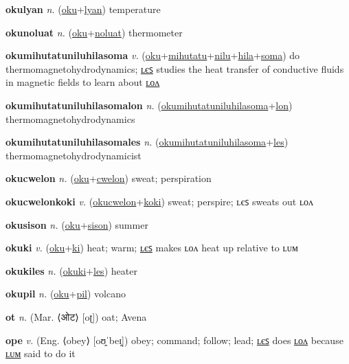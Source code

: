 \textbf{\hypertarget{okulyan}{okulyan}} \textit{n.} (\hyperlink{oku}{oku}+\allowbreak \hyperlink{lyan}{lyan})
temperature

\textbf{\hypertarget{okunoluat}{okunoluat}} \textit{n.} (\hyperlink{oku}{oku}+\allowbreak \hyperlink{noluat}{noluat})
thermometer

\textbf{\hypertarget{okumihutatuniluhilasoma}{okumihutatuniluhilasoma}} \textit{v.} (\hyperlink{oku}{oku}+\allowbreak \hyperlink{mihutatu}{mihutatu}+\allowbreak \hyperlink{nilu}{nilu}+\allowbreak \hyperlink{hila}{hila}+\allowbreak \hyperlink{soma}{soma})
do thermomagnetohydrodynamics; \hyperlink{okumihutatuniluhilasomales}{ʟєꜱ} studies the heat transfer of conductive fluids in magnetic fields to learn about \hyperlink{okumihutatuniluhilasomalon}{ʟᴏᴧ}

\textbf{\hypertarget{okumihutatuniluhilasomalon}{okumihutatuniluhilasomalon}} \textit{n.} (\hyperlink{okumihutatuniluhilasoma}{okumihutatuniluhilasoma}+\allowbreak \hyperlink{lon}{lon})
thermomagnetohydrodynamics

\textbf{\hypertarget{okumihutatuniluhilasomales}{okumihutatuniluhilasomales}} \textit{n.} (\hyperlink{okumihutatuniluhilasoma}{okumihutatuniluhilasoma}+\allowbreak \hyperlink{les}{les})
thermomagnetohydrodynamicist

\textbf{\hypertarget{okucwelon}{okucwelon}} \textit{n.} (\hyperlink{oku}{oku}+\allowbreak \hyperlink{cwelon}{cwelon})
sweat; perspiration

\textbf{\hypertarget{okucwelonkoki}{okucwelonkoki}} \textit{v.} (\hyperlink{okucwelon}{okucwelon}+\allowbreak \hyperlink{koki}{koki})
sweat; perspire; ʟєꜱ sweats out ʟᴏᴧ

\textbf{\hypertarget{okusison}{okusison}} \textit{n.} (\hyperlink{oku}{oku}+\allowbreak \hyperlink{sison}{sison})
summer

\textbf{\hypertarget{okuki}{okuki}} \textit{v.} (\hyperlink{oku}{oku}+\allowbreak \hyperlink{ki}{ki})
heat; warm; \hyperlink{okukiles}{ʟєꜱ} makes ʟᴏᴧ heat up relative to ʟᴜᴍ

\textbf{\hypertarget{okukiles}{okukiles}} \textit{n.} (\hyperlink{okuki}{okuki}+\allowbreak \hyperlink{les}{les})
heater

\textbf{\hypertarget{okupil}{okupil}} \textit{n.} (\hyperlink{oku}{oku}+\allowbreak \hyperlink{pil}{pil})
volcano

\textbf{\hypertarget{ot}{ot}} \textit{n.} (Mar. ⟨{\devanagari{}ओट}⟩ [oʈ])
oat; Avena

\textbf{\hypertarget{ope}{ope}} \textit{v.} (Eng. ⟨obey⟩ [oʊ̯ˈbeɪ̯])
obey; command; follow; lead; \hyperlink{opeles}{ʟєꜱ} does \hyperlink{opelon}{ʟᴏᴧ} because \hyperlink{opelum}{ʟᴜᴍ} said to do it

